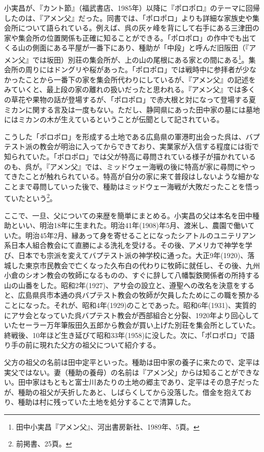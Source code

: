 小実昌が、『カント節』（福武書店、1985年）以降に『ポロポロ』のテーマに回帰したのは、『アメン父』だった。同書では、「ポロポロ」よりも詳細な家族史や集会所について語られている。例えば、呉の灰ヶ峰を背にして右手にある三津田の家や集会所の位置関係も正確に知ることができる。「ポロポロ」の作中でも出てくる山の側面にある平屋が一番下にあり、種助が「中段」と呼んだ旧阪田（『アメン父』では坂田）別荘の集会所が、上の山の尾根にある家との間にある\footnote{田中小実昌『アメン父』、河出書房新社、1989年、5頁。}。集会所の周りにはドングリや桜があった。「ポロポロ」では戦時中に参拝者が少なかったことから一番下の家を集会所代わりにしているが、『アメン父』の記述をみていくと、最上段の家の離れの扱いだったと思われる。『アメン父』では多くの草花や果物の話が登場するが、「ポロポロ」で赤大根と対になって登場する夏ミカンに関する言及は一度もない。ただし、静岡県にあった田中家の墓には墓地にはミカンの木が生えているということが伝聞として記されている。

こうした「ポロポロ」を形成する土地である広島県の軍港町出会った呉は、バプテスト派の教会が明治に入ってからできており、実業家が入信する程度には街で知られていた。「ポロポロ」では父が特高に尋問されている様子が描かれているのも、呉が。『アメン父』では、ミッドウェー海戦の後に特高が家に尋問にやってきたことが触れられている。特高が自分の家に来て普段はしないような細かなことまで尋問していった後で、種助はミッドウェー海戦が大敗だったことを悟っていたという\footnote{前掲書、25頁。}。

ここで、一旦、父についての来歴を簡単にまとめる。小実昌の父は本名を田中種助といい、明治18年に生まれた。明治41年(1908)年5月、渡米し、農園で働いていた。明治45年2月、縁あって身を寄せることになったシアトルのユニテリアン系日本人組合教会にて直勝による洗礼を受ける。その後、アメリカで神学を学び、日本でも宗派を変えてバプテスト派の神学校に通った。大正9年(1920)、落城した東京市民教会で亡くなった久布白の代わりに牧師に就任し、その後、九州小倉のシオン教会の牧師になるものの、すぐに辞して八幡製鉄関係者の所持する山の山番をした。昭和2年(1927)、アサ会の設立と、遵聖への改名を決意をすると、広島県呉市本通の呉バプテスト教会の牧師が欠員したためにこの職を預かることになった。それが、昭和4年(1929)のことであった。昭和6年(1931)、実質的にアサ会となっていた呉バプテスト教会が西部組合と分裂、1920年より回心していたセーラー万年筆阪田久五郎から教会が買い上げた別荘を集会所としていた。終戦後、10年ほど生き延びて昭和33年(1958)に没した。次に、「ポロポロ」で語り手の前に現れた父方の祖父について紹介する。

父方の祖父の名前は田中定平といった。種助は田中家の養子に来たので、定平は実父ではない。妻（種助の養母）の名前は『アメン父」からは知ることができない。田中家はもともと富士川あたりの土地の郷主であり、定平はその息子だったが、種助の祖父が夭折したあと、しばらくしてから没落した。借金を抱えており、種助は村に残っていた土地を処分することで清算した。 

